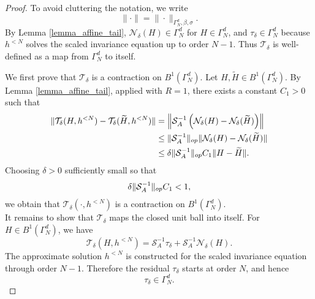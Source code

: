 \documentclass[10pt,a4paper]{amsart}
\begin{document}
\begin{proof}
To avoid cluttering the notation, we write
\begin{equation}
        \|\cdot\|=\|\cdot\|_{\Gamma_N^d,\beta,\sigma}.
\end{equation}
By Lemma \ref{lemma_affine_tail}, $\mathcal N_\delta(H)\in\Gamma_N^d$ for
$H\in\Gamma_N^d$, and $\tau_\delta\in\Gamma_N^d$ because $h^{<N}$ solves the scaled
invariance equation up to order $N-1$. Thus $\mathcal T_\delta$ is well-defined as a map
from $\Gamma_N^d$ to itself.

We first prove that $\mathcal T_\delta$ is a contraction on $B^1(\Gamma_N^d)$. Let
$H,\widetilde H\in B^1(\Gamma_N^d)$. By Lemma \ref{lemma_affine_tail}, applied with
$R=1$, there exists a constant $C_1>0$ such that
\begin{equation}\label{contraction_revised}
\begin{split}
        \|\mathcal T_\delta(H,h^{<N})-\mathcal T_\delta(\widetilde H,h^{<N})\|
        &=
        \left\|
        \mathcal S_A^{-1}
        \left(
        \mathcal N_\delta(H)-\mathcal N_\delta(\widetilde H)
        \right)
        \right\| \\
        &\le
        \|\mathcal S_A^{-1}\|_{\rm op}
        \|\mathcal N_\delta(H)-\mathcal N_\delta(\widetilde H)\| \\
        &\le
        \delta
        \|\mathcal S_A^{-1}\|_{\rm op}
        C_1
        \|H-\widetilde H\|.
\end{split}
\end{equation}
Choosing $\delta>0$ sufficiently small so that
\begin{equation}
        \delta
        \|\mathcal S_A^{-1}\|_{\rm op}
        C_1
        <1,
\end{equation}
we obtain that $\mathcal T_\delta(\cdot,h^{<N})$ is a contraction on
$B^1(\Gamma_N^d)$.\\
It remains to show that $\mathcal T_\delta$ maps the closed unit ball into itself. For
$H\in B^1(\Gamma_N^d)$, we have
\begin{equation}\label{ball_revised}
        \mathcal T_\delta(H,h^{<N})
        =
        \mathcal S_A^{-1}\tau_\delta
        +
        \mathcal S_A^{-1}\mathcal N_\delta(H).
\end{equation}
The approximate solution $h^{<N}$ is constructed for the scaled
invariance equation through order $N-1$. Therefore the residual $\tau_\delta$ starts at order $N$, and hence
\begin{equation}
    \tau_\delta\in\Gamma_N^d.

\end{equation}
\end{proof}
\end{document}
